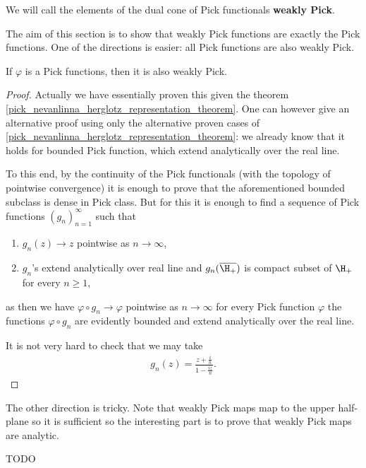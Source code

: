 \begin{maar}
	We will call the elements of the dual cone of Pick functionals \textbf{weakly Pick}.
\end{maar}

The aim of this section is to show that weakly Pick functions are exactly the Pick functions. One of the directions is easier: all Pick functions are also weakly Pick.

\begin{lause}
	If $\varphi$ is a Pick functions, then it is also weakly Pick.
\end{lause}
\begin{proof}
	Actually we have essentially proven this given the theorem \ref{pick_nevanlinna_herglotz_representation_theorem}. One can however give an alternative proof using only the alternative proven cases of \ref{pick_nevanlinna_herglotz_representation_theorem}: we already know that it holds for bounded Pick function, which extend analytically over the real line.

	To this end, by the continuity of the Pick functionals (with the topology of pointwise convergence) it is enough to prove that the aforementioned bounded subclass is dense in Pick class. But for this it is enough to find a sequence of Pick functions $(g_{n})_{n = 1}^{\infty}$ such that
	\begin{enumerate}
		\item $g_{n}(z) \to z$ pointwise as $n \to \infty$,
		\item $g_{n}$'s extend analytically over real line and $g_{n}(\overline{\H_{+}})$ is compact subset of $\H_{+}$ for every $n \geq 1$,
	\end{enumerate}
	as then we have $\varphi \circ g_{n} \to \varphi$ pointwise as $n \to \infty$ for every Pick function $\varphi$ the functions $\varphi \circ g_{n}$ are evidently bounded and extend analytically over the real line.

	It is not very hard to check that we may take
	\begin{align*}
		g_{n}(z) = \frac{z + \frac{i}{n}}{1 - \frac{i z}{n}}.
	\end{align*}
\end{proof}

The other direction is tricky. Note that weakly Pick maps map to the upper half-plane so it is sufficient so the interesting part is to prove that weakly Pick maps are analytic.

TODO






